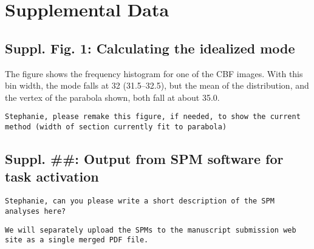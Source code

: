 \section*{Supplemental Data}

\subsection{Suppl. Fig. 1: Calculating the idealized mode}
The figure shows the frequency histogram for one of the CBF images. With this bin width, the mode falls at 32 (31.5--32.5), but the mean of the distribution, and the vertex of the parabola shown, both fall at about 35.0. 

\verb|Stephanie, please remake this figure, if needed, to show the current method (width of section currently fit to parabola)|

\subsection{Suppl. ##: Output from SPM software for task activation}
\verb|Stephanie, can you please write a short description of the SPM analyses here?|

\verb|We will separately upload the SPMs to the manuscript submission web site as a single merged PDF file.|

